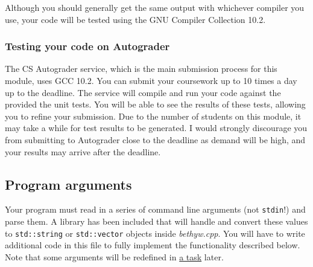 \documentclass[a4paper]{article}
\begin{document}
Although you should generally get the same output with whichever compiler you use, your code will be tested using the GNU Compiler Collection 10.2.

\subsubsection*{Testing your code on Autograder}
The CS Autograder service, which is the main submission process for this module, uses GCC 10.2. You can submit your coursework up to 10 times a day up to the deadline. The service will compile and run your code against the provided the unit tests. You will be able to see the results of these tests, allowing you to refine your submission. Due to the number of students on this module, it may take a while for test results to be generated. I would strongly discourage you from submitting to Autograder close to the deadline as demand will be high, and your results may arrive after the deadline.



\subsection*{Program arguments}\label{sec:cwk args}

Your program must read in a series of command line arguments (not \texttt{stdin}!) and parse them. A library has been included that will handle and convert these values to \texttt{std::string} or \texttt{std::vector} objects inside \emph{bethyw.cpp}. You will have to write additional code in this file to fully implement the functionality described below. Note that some arguments will be redefined in \hyperref[sec:tasks extended-args]{a task} later.
\end{document}
